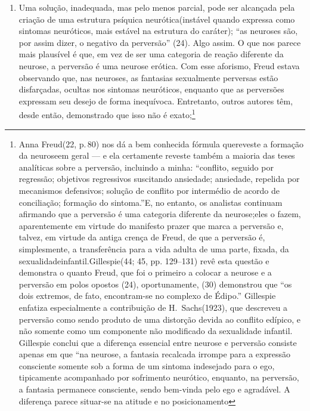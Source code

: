 \begin{enumerate}
\item Uma solução, inadequada, mas pelo menos parcial, pode ser
alcançada pela criação de uma estrutura psíquica neurótica\idxpervneuro[|(] (instável
quando expressa como sintomas\idxsinto{} neuróticos, mais estável na estrutura do
caráter); ``as neuroses são, por assim dizer, o negativo
da perversão'' (24). Algo assim. O que nos parece mais
plausível é que, em vez de ser uma categoria de reação diferente da
neurose, a perversão é uma neurose erótica. Com esse aforismo, Freud
estava observando que, nas neuroses, as fantasias sexualmente perversas
estão disfarçadas, ocultas nos sintomas neuróticos, enquanto que as
perversões expressam seu desejo de forma inequívoca. Entretanto, outros
autores têm, desde então, demonstrado que isso não é exato;\footnote{ Anna 
Freud\idxannaf[|nn] (22, p.\,80) nos dá
a bem conhecida fórmula que\idxfreudperve[|nn] reveste a formação da 
neurose\idxfreudneuro[|nn] em geral --- e ela
certamente reveste também a maioria das teses analíticas sobre a
perversão, incluindo a minha: ``conflito, seguido por
regressão; objetivos regressivos suscitando ansiedade; ansiedade,
repelida por mecanismos defensivos; solução de conflito por intermédio
de acordo de conciliação; formação do sintoma.''\idxsinto[|nn] E, no
entanto, os analistas continuam afirmando que a perversão é uma
categoria diferente da neurose;\idxneuro[|nn] eles o fazem, aparentemente em virtude
do manifesto prazer que marca a perversão e, talvez, em virtude da
antiga crença de Freud, de que a perversão é, simplesmente, a
transferência para a vida adulta de uma parte, fixada, da sexualidade\idxsexui[|nn]
infantil.\idxinfansexua[|nn] Gillespie\idxgille[|nn] (44; 45, pp. 129--131) revê esta questão e demonstra
o quanto Freud, que foi o primeiro a colocar a neurose e a perversão em
polos opostos (24), oportunamente, (30) demonstrou que
``os dois extremos, de fato, encontram-se no complexo de
Édipo.'' Gillespie enfatiza especialmente a contribuição
de H.~Sachs\idxsachs[|nn] (1923), que descreveu a perversão como sendo produto de uma
distorção devida ao conflito edípico, e não somente como um componente
não modificado da sexualidade infantil. Gillespie conclui que a
diferença essencial entre neurose e perversão consiste apenas em que
``na neurose, a fantasia recalcada irrompe para a
expressão consciente somente sob a forma de um sintoma indesejado para
o ego, tipicamente acompanhado por sofrimento neurótico, enquanto, na
perversão, a fantasia permanece consciente, sendo bem-vinda pelo ego e
agradável. A diferença parece situar-se na atitude e no posicionamento
}
\end{enumerate}
